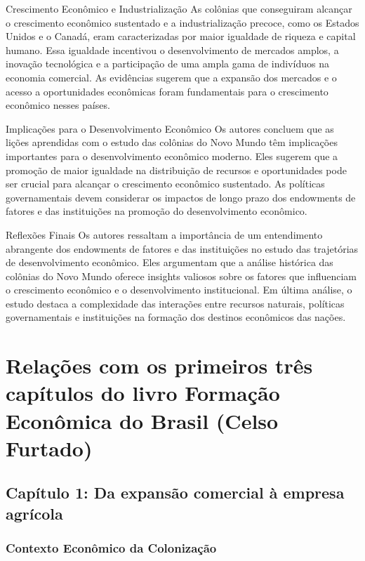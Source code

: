 \documentclass[a4paper,12pt]{article}[abntex2]
\begin{document}
Crescimento Econômico e Industrialização
As colônias que conseguiram alcançar o crescimento econômico sustentado e a industrialização precoce, como os Estados Unidos e o Canadá, eram caracterizadas por maior igualdade de riqueza e capital humano. Essa igualdade incentivou o desenvolvimento de mercados amplos, a inovação tecnológica e a participação de uma ampla gama de indivíduos na economia comercial. As evidências sugerem que a expansão dos mercados e o acesso a oportunidades econômicas foram fundamentais para o crescimento econômico nesses países.

Implicações para o Desenvolvimento Econômico
Os autores concluem que as lições aprendidas com o estudo das colônias do Novo Mundo têm implicações importantes para o desenvolvimento econômico moderno. Eles sugerem que a promoção de maior igualdade na distribuição de recursos e oportunidades pode ser crucial para alcançar o crescimento econômico sustentado. As políticas governamentais devem considerar os impactos de longo prazo dos endowments de fatores e das instituições na promoção do desenvolvimento econômico.

Reflexões Finais
Os autores ressaltam a importância de um entendimento abrangente dos endowments de fatores e das instituições no estudo das trajetórias de desenvolvimento econômico. Eles argumentam que a análise histórica das colônias do Novo Mundo oferece insights valiosos sobre os fatores que influenciam o crescimento econômico e o desenvolvimento institucional. Em última análise, o estudo destaca a complexidade das interações entre recursos naturais, políticas governamentais e instituições na formação dos destinos econômicos das nações.

\newpage
\section{\textbf{Relações com os primeiros três capítulos do livro Formação Econômica do Brasil (Celso Furtado)}}

\subsection*{\textbf{Capítulo 1: Da expansão comercial à empresa agrícola}}

\subsubsection*{Contexto Econômico da Colonização}
\end{document}
